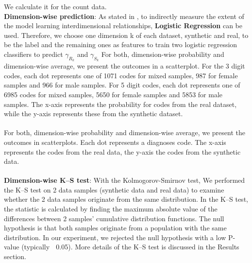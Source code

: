 \documentclass[11pt, a4paper]{book}
\begin{document}
We calculate it for the count data.
\\

\textbf{Dimension-wise prediction}: As stated in \cite{Choi2017}, to indirectly measure the extent of the model learning interdimensional relationships, \textbf{Logistic Regression} can be used. Therefore, we choose one dimension k of each dataset, synthetic and real, to be the label and the remaining  ones as features to train two logistic regression classifiers to predict $\gamma_R_k$ and $\gamma_S_k$
For both, dimension-wise probability and dimension-wise average, we present the outcomes in a scatterplot. For the 3 digit codes, each dot represents one of 1071 codes for mixed samples, 987 for female samples and 966 for male samples. For 5 digit codes, each dot represents one of 6985 codes for mixed samples, 5650 for female samples and 5853 for male samples. The x-axis represents the probability for codes from the real dataset, while the y-axis represents these from the synthetic dataset.
\\
\\
For both, dimension-wise probability and dimension-wise average, we present the outcomes in scatterplots. Each dot represents a diagnoses code. The x-axis represents the codes from the real data, the y-axis the codes from the synthetic data.
\\
\\
\textbf{Dimension-wise K–S test}: With the Kolmogorov-Smirnov test,  We performed the K–S test on 2 data samples (synthetic data and real data) to examine whether the 2 data samples originate from the same distribution. In the K–S test, the statistic is calculated by finding the maximum absolute value of the differences between 2 samples’ cumulative distribution functions. The null hypothesis is that both samples originate from a population with the same distribution. In our experiment, we rejected the null hypothesis with a low P-value (typically 􏰆 0.05). More details of the K–S test is discussed in the Results section. 
\\
\end{document}
